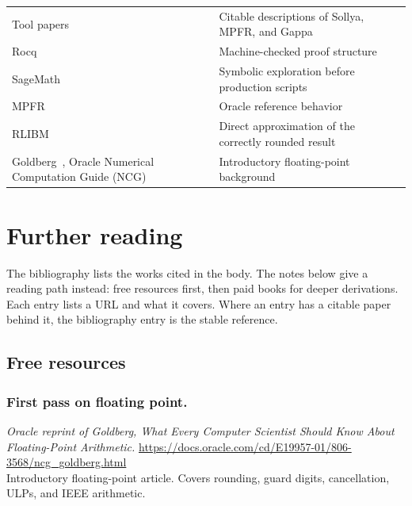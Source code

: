 \documentclass[manuscript, nonacm]{acmart}
\begin{document}
\begin{table}[tbp]
\begin{tabular}{>{\raggedright\arraybackslash}p{5.3cm}>{\raggedright\arraybackslash}p{6.1cm}}
            Tool papers~\cite{sollyapaper,mpfrpaper,gappapaper}
            & Citable descriptions of Sollya, MPFR, and Gappa                  \\
            Rocq~\cite{rocq}
            & Machine-checked proof structure                                  \\
            SageMath~\cite{sagemath}
            & Symbolic exploration before production scripts                   \\
            MPFR~\cite{mpfr}
            & Oracle reference behavior                                        \\
            RLIBM~\cite{rlibm}
            & Direct approximation of the correctly rounded result             \\
            Goldberg~\cite{goldberg}, Oracle Numerical Computation Guide (NCG)~\cite{oracle}
            & Introductory floating-point background                           \\
            \bottomrule
        \end{tabular}
    \end{table}



    \section{Further reading}

    The bibliography lists the works cited in the body. The notes below give a
    reading path instead: free resources first, then paid books for deeper
    derivations. Each entry lists a URL and what it covers. Where an entry has a
    citable paper behind it, the bibliography entry is the stable reference.

    \subsection{Free resources}

    \subsubsection{First pass on floating point.}

    \emph{Oracle reprint of Goldberg, What Every Computer Scientist Should Know
    About Floating-Point Arithmetic.}
    \url{https://docs.oracle.com/cd/E19957-01/806-3568/ncg_goldberg.html}\\
    Introductory floating-point article. Covers rounding, guard digits,
    cancellation, ULPs, and IEEE arithmetic.
\end{document}

